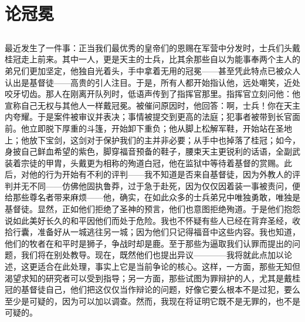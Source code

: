 
\chapter{论冠冕}


\par


\section{}

最近发生了一件事：正当我们最优秀的皇帝们的恩赐在军营中分发时，士兵们头戴桂冠走上前来。其中一人，更是天主的士兵，比其余那些自以为能事奉两个主人的弟兄们更加坚定，他独自光着头，手中拿着无用的冠冕——甚至凭此特点已被众人认出是基督徒——高贵的引人注目。于是，所有人都开始指认他，远处嘲笑，近处咬牙切齿。那人在刚离开队列时，低语声传到了指挥官那里。指挥官立刻问他：他宣称自己无权与其他人一样戴冠冕。被催问原因时，他回答：啊，士兵！你在天主内夸耀。于是案件被审议并表决；事情被提交到更高的法庭；犯事者被带到长官面前。他立即脱下厚重的斗篷，开始卸下重负；他从脚上松解军鞋，开始站在圣地上；他放下宝剑，这剑对于保护我们的主并非必要；从手中也掉落了桂冠；如今，身披自己鲜血希望的紫色，脚穿福音预备的鞋子，腰束天主更锐利的话语，全副武装着宗徒的甲胄，头戴更为相称的殉道白冠，他在监狱中等待着基督的赏赐。此后，对他的行为开始有不利的评判——我不知道是否来自基督徒，因为外教人的评判并无不同——仿佛他固执鲁莽，过于急于赴死，因为仅仅因着装一事被责问，便给那些尊名者带来麻烦——他，确实，在如此众多的士兵弟兄中唯独勇敢，唯独是基督徒。显然，正如他们拒绝了圣神的预言，他们也意图拒绝殉道。于是他们抱怨说如此美好长久的和平因他们而处于危险。我也不怀疑有些人已经在背弃圣经，收拾行囊，准备好从一城逃往另一城；因为他们只记得福音中这些内容。我也知道，他们的牧者在和平时是狮子，争战时却是鹿。至于那些为逼取我们认罪而提出的问题，我们将在别处教导。现在，既然他们也提出异议————我将就此点加以论述，这更适合在此处理，事实上它是当前争论的核心。这样，一方面，那些无知但渴望求知的研究者可以受到指导；另一方面，那些试图为罪辩护的人，尤其是戴桂冠的基督徒自己，他们把这仅仅当作辩论的问题，好像它要么根本不是过犯，要么至少是可疑的，因为可以加以调查。然而，我现在将证明它既不是无罪的，也不是可疑的。\par

